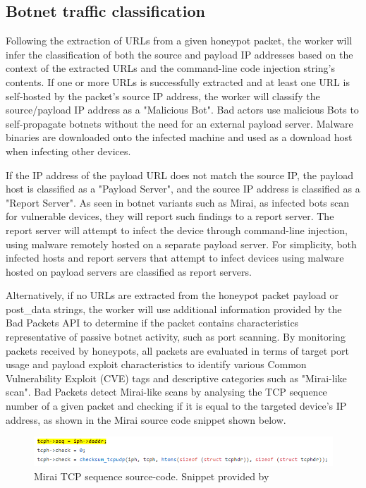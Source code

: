 \subsection{Botnet traffic classification}

Following the extraction of URLs from a given honeypot packet, the worker will infer the classification of both the source and payload IP addresses based on the context of the extracted URLs and the command-line code injection string's contents. If one or more URLs is successfully extracted and at least one URL is self-hosted by the packet's source IP address, the worker will classify the source/payload IP address as a "Malicious Bot". Bad actors use malicious Bots to self-propagate botnets without the need for an external payload server. Malware binaries are downloaded onto the infected machine and used as a download host when infecting other devices.

If the IP address of the payload URL does not match the source IP, the payload host is classified as a "Payload Server", and the source IP address is classified as a "Report Server". As seen in botnet variants such as Mirai, as infected bots scan for vulnerable devices, they will report such findings to a report server. The report server will attempt to infect the device through command-line injection, using malware remotely hosted on a separate payload server. For simplicity, both infected hosts and report servers that attempt to infect devices using malware hosted on payload servers are classified as report servers.

Alternatively, if no URLs are extracted from the honeypot packet payload or post\_data strings, the worker will use additional information provided by the Bad Packets API to determine if the packet contains characteristics representative of passive botnet activity, such as port scanning. By monitoring packets received by honeypots, all packets are evaluated in terms of target port usage and payload exploit characteristics to identify various Common Vulnerability Exploit (CVE) tags and descriptive categories such as "Mirai-like scan". Bad Packets detect Mirai-like scans by analysing the TCP sequence number of a given packet and checking if it is equal to the targeted device's IP address, as shown in the Mirai source code snippet shown below. \citep{BadPacketsMirai}

\begin{figure}[!htb]
    \centering
    \includegraphics[width=0.75\linewidth]{images/mirai-like-signature.png}
    \caption{Mirai TCP sequence source-code. Snippet provided by \citet{BadPackets}}
    \label{fig:mirai_like_scan} 
\end{figure}

